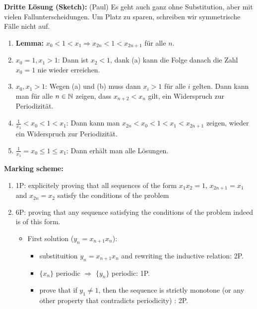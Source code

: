 {\textbf{Dritte Lösung (Sketch):} (Paul) Es geht auch ganz ohne Substitution, aber mit vielen Fallunterscheidungen. Um Platz zu sparen, schreiben wir symmetrische Fälle nicht auf.

\begin{enumerate}
\item \textbf{Lemma:} $x_0<1<x_1\Rightarrow x_{2n}<1<x_{2n+1}$ für alle $n$. 
\item $x_0=1, x_1 > 1$: Dann ist $x_2<1$, dank (a) kann die Folge danach die Zahl $x_0=1$ nie wieder erreichen.
\item $x_0, x_1 > 1$: Wegen (a) und (b) muss dann $x_i>1$ für alle $i$ gelten. Dann kann man für alle $n\in\mathbb{N}$ zeigen, dass $x_{n+2} < x_n$ gilt, ein Widerspruch zur Periodizität.
\item $\tfrac{1}{x_1} < x_0 < 1 < x_1$: Dann kann man $x_{2n} <x_0 < 1 < x_1 < x_{2n+1}$ zeigen, wieder ein Widerspruch zur Periodizität.
\item $\tfrac{1}{x_1} = x_0 \leq 1 \leq x_1$: Dann erhält man alle Lösungen.
\end{enumerate}

\textbf{Marking scheme:}

\begin{enumerate}
    \item 1P: explicitely proving that all sequences of the form $x_1x_2=1$, $x_{2n+1}=x_1$ and $x_{2n}=x_2$ satisfy the conditions of the problem
    \item 6P: proving that any sequence satisfying the conditions of the problem indeed is of this form.
    \begin{itemize}
        \item First solution ($y_n=x_{n+1}x_n$):
    \begin{itemize}
        \item substituition $y_n=x_{n+1}x_n$ and rewriting the inductive relation: 2P.
        \item $\{x_n\}$ periodic $\Rightarrow$ $\{y_n\}$ periodic: 1P.
        \item prove that if $y_1\neq 1$, then the sequence is strictly monotone (or any other property that contradicts periodicity) : 2P. 
        

\end{itemize}
\end{itemize}
\end{enumerate}}
